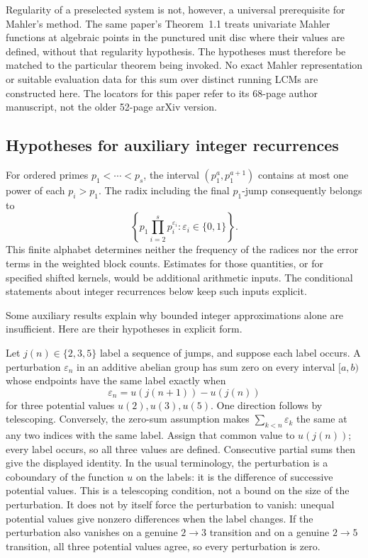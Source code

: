 Regularity of a preselected system is not, however, a universal prerequisite
for Mahler's method.  The same paper's Theorem~1.1 treats univariate Mahler
functions at algebraic points in the punctured unit disc where their values
are defined, without that regularity hypothesis.  The hypotheses must
therefore be matched to the particular theorem being invoked.  No exact
Mahler representation or suitable evaluation data for this sum over distinct running LCMs are constructed here.  The locators for this paper refer to its 68-page
author manuscript, not the older 52-page arXiv version.

\subsection{Hypotheses for auxiliary integer recurrences}\label{long269:sec:carry-hypotheses}

For ordered primes $p_1<\cdots<p_s$, the interval
$(p_1^a,p_1^{a+1})$ contains at most one power of each $p_i>p_1$.
The radix including the final $p_1$-jump consequently belongs to
\[
 \left\{p_1\prod_{i=2}^s p_i^{\varepsilon_i}:
                  \varepsilon_i\in\{0,1\}\right\}.
\]
This finite alphabet determines neither the frequency of the radices nor
the error terms in the weighted block counts. Estimates for those
quantities, or for specified shifted kernels, would be additional
arithmetic inputs. The conditional statements about integer recurrences below keep such
inputs explicit.

Some auxiliary results explain why bounded integer approximations alone
are insufficient.  Here are their hypotheses in explicit form.

Let $j(n)\in\{2,3,5\}$ label a sequence of jumps, and suppose each label
occurs.  A perturbation $\varepsilon_n$ in an additive abelian group has
sum zero on every
interval $[a,b)$ whose endpoints have the same label exactly when
\[
 \varepsilon_n=u(j(n+1))-u(j(n))
\]
for three potential values $u(2),u(3),u(5)$.  One direction follows by
telescoping.  Conversely, the zero-sum assumption makes
$\sum_{k<n}\varepsilon_k$ the same at any two indices with the same
label.  Assign that common value to $u(j(n))$; every label occurs, so all
three values are defined.  Consecutive partial sums then give the
displayed identity.  In the usual terminology, the perturbation is a
coboundary of the function $u$ on the labels: it is the difference of
successive potential values.  This is a telescoping condition, not a bound
on the size of the perturbation.  It does not by
itself force the perturbation to vanish: unequal potential values give
nonzero differences when the label changes.  If the perturbation also
vanishes on a genuine $2\to3$ transition and on a genuine $2\to5$
transition, all three potential values agree, so every perturbation is
zero.

